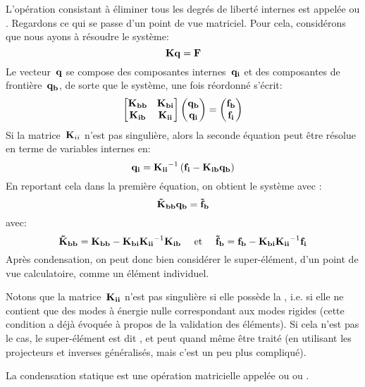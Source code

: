 L'opération consistant à éliminer tous les degrés de liberté internes est appelée  ou .
\medskipvm
Regardons ce qui se passe d'un point de vue matriciel.
Pour cela, considérons que nous ayons à résoudre le système:
\begin{equation} \MM{K} \VV{q}=\VV{F}\end{equation}
Le vecteur~$\VV{q}$ se compose des composantes internes~$\VV{q_i}$ et des composantes
de frontière~$\VV{q_b}$, de sorte que le système, une fois réordonné s'écrit:
\begin{equation}
\MM*{\MM{K_{bb}} & \MM{K_{bi}}\\
\MM{K_{ib}} & \MM{K_{ii}}}
\VV*{\VV{q_b}\\\VV{q_i}}
=
\VV*{\VV{f_b}\\\VV{f_i}}
\end{equation}
Si la matrice~$\MM{K}_{ii}$ n'est pas singulière, alors la seconde équation peut être résolue en terme de variables internes en:
\begin{equation}
\VV{q_i} = \MMI{K_{ii}}\left(\VV{f_i}-\MM{K_{ib}}\VV{q_b}\right)
\end{equation}
En reportant cela dans la première équation, on obtient le système avec :
\begin{equation}
\MM{\tilde{K}_{bb}}\VV{q_b} = \VV{\tilde{f}_b}
\end{equation}
avec:
\begin{equation}
\MM{\tilde{K}_{bb}}=\MM{K_{bb}} - \MM{K_{bi}}\MMI{K_{ii}}\MM{K_{ib}}
\quad \text{ et }\quad
\VV{\tilde{f}_b}=\VV{f_b} - \MM{K_{bi}}\MMI{K_{ii}}\VV{f_i}
\end{equation}
Après condensation, on peut donc bien considérer le super-élément, d'un point de vue calculatoire, comme un élément individuel.

\medskip
Notons que la matrice~$\MM{K_{ii}}$ n'est pas singulière si elle possède la , i.e. si elle ne contient que des modes à énergie nulle correspondant aux modes rigides (cette condition a déjà évoquée à propos de la validation des éléments). Si cela n'est pas le cas, le super-élément est dit , et peut quand même être traité (en utilisant les projecteurs et inverses généralisés, mais c'est un peu plus compliqué).

La condensation statique est une opération matricielle appelée  ou  ou .

